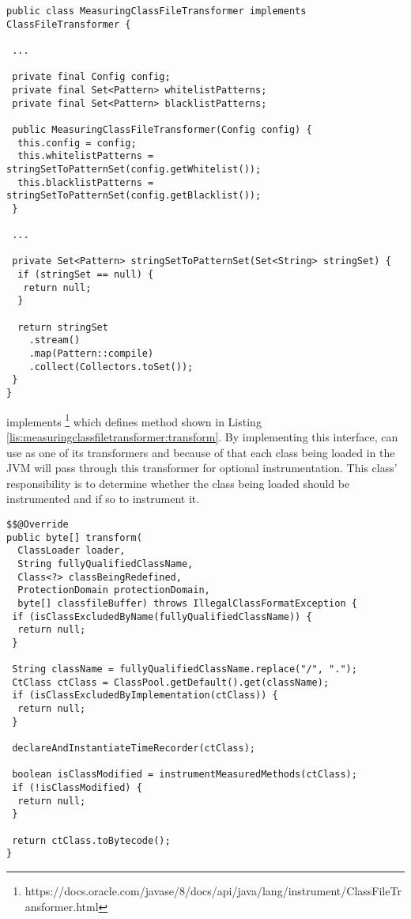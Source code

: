 \begin{lstlisting}[breaklines,caption={$MeasuringClassFileTransformer$ initialization},label=lis:measuringclassfiletransformer:constructor]
public class MeasuringClassFileTransformer implements ClassFileTransformer {

 ...

 private final Config config;
 private final Set<Pattern> whitelistPatterns;
 private final Set<Pattern> blacklistPatterns;

 public MeasuringClassFileTransformer(Config config) {
  this.config = config;
  this.whitelistPatterns = stringSetToPatternSet(config.getWhitelist());
  this.blacklistPatterns = stringSetToPatternSet(config.getBlacklist());
 }

 ...

 private Set<Pattern> stringSetToPatternSet(Set<String> stringSet) {
  if (stringSet == null) {
   return null;
  }

  return stringSet
    .stream()
    .map(Pattern::compile)
    .collect(Collectors.toSet());
 }
}
\end{lstlisting}

\noindent {} implements  \footnote{https://docs.oracle.com/javase/8/docs/api/java/lang/instrument/ClassFileTransformer.html} which defines method  shown in Listing \ref{lis:measuringclassfiletransformer:transform}. By implementing this interface,  can use  as one of its transformers and because of that each class being loaded in the JVM will pass through this transformer for optional instrumentation. This class' responsibility is to determine whether the class being loaded should be instrumented and if so to instrument it.

\begin{lstlisting}[breaklines,caption={$MeasuringClassFileTransformer.transform$ implementation},label=lis:measuringclassfiletransformer:transform]
$$@Override
public byte[] transform(
  ClassLoader loader,
  String fullyQualifiedClassName,
  Class<?> classBeingRedefined,
  ProtectionDomain protectionDomain,
  byte[] classfileBuffer) throws IllegalClassFormatException {
 if (isClassExcludedByName(fullyQualifiedClassName)) {
  return null;
 }

 String className = fullyQualifiedClassName.replace("/", ".");
 CtClass ctClass = ClassPool.getDefault().get(className);
 if (isClassExcludedByImplementation(ctClass)) {
  return null;
 }

 declareAndInstantiateTimeRecorder(ctClass);

 boolean isClassModified = instrumentMeasuredMethods(ctClass);
 if (!isClassModified) {
  return null;
 }

 return ctClass.toBytecode();
}
\end{lstlisting}


